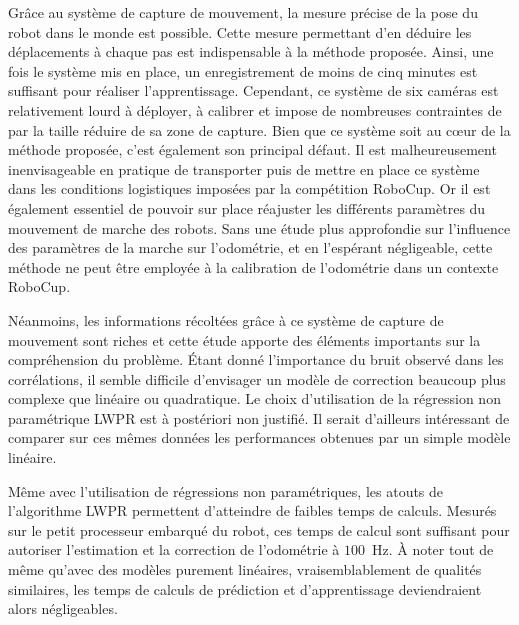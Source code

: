 Grâce au système de capture de mouvement, la mesure précise de la pose du robot
dans le monde est possible. Cette mesure permettant d'en déduire les déplacements 
à chaque pas est indispensable à la méthode proposée.
Ainsi, une fois le système mis en place, un enregistrement de moins 
de cinq minutes est suffisant pour réaliser l'apprentissage.
Cependant, ce système de six caméras est relativement lourd à déployer, 
à calibrer et impose de nombreuses contraintes de par la taille réduire de sa zone de capture.
Bien que ce système soit au cœur de la méthode proposée, c'est également son principal défaut.
Il est malheureusement inenvisageable en pratique de transporter puis de mettre 
en place ce système dans les conditions logistiques imposées par la compétition RoboCup.
Or il est également essentiel de pouvoir sur place réajuster les différents paramètres
du mouvement de marche des robots.
Sans une étude plus approfondie sur l'influence des paramètres de la marche sur l'odométrie,
et en l'espérant négligeable, cette méthode ne peut être employée à la calibration 
de l'odométrie dans un contexte RoboCup.

Néanmoins, les informations récoltées grâce à ce système de capture de mouvement sont riches 
et cette étude apporte des éléments importants sur la compréhension du problème.
Étant donné l'importance du bruit observé dans les corrélations, il semble difficile 
d'envisager un modèle de correction beaucoup plus complexe que linéaire ou quadratique.
Le choix d'utilisation de la régression non paramétrique LWPR est à postériori non justifié.
Il serait d'ailleurs intéressant de comparer sur ces mêmes données les performances 
obtenues par un simple modèle linéaire.

Même avec l'utilisation de régressions non paramétriques, les atouts de l'algorithme 
LWPR permettent d'atteindre de faibles temps de calculs.
Mesurés sur le petit processeur embarqué du robot, ces temps de calcul sont suffisant 
pour autoriser l'estimation et la correction de l'odométrie à $100$~Hz.
À noter tout de même qu'avec des modèles purement linéaires, vraisemblablement de qualités similaires,
les temps de calculs de prédiction et d'apprentissage deviendraient alors négligeables.\\

